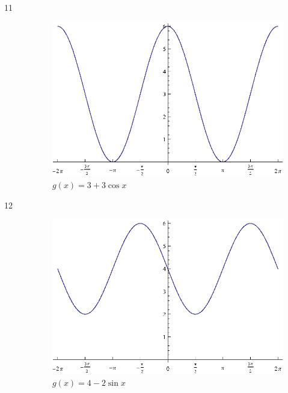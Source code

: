 \documentclass{exam}
\begin{document}
\begin{description}
      \item[11]
        \begin{figure}[H]
          \centering
          \includegraphics[scale=0.9]{exercise11.eps}
          \caption{$g(x) = 3 + 3 \cos x$}
        \end{figure}

      \item[12]
        \begin{figure}[H]
          \centering
          \includegraphics[scale=0.9]{exercise12.eps}
          \caption{$g(x) = 4 - 2 \sin x$}
        \end{figure}


\end{description}
\end{document}
